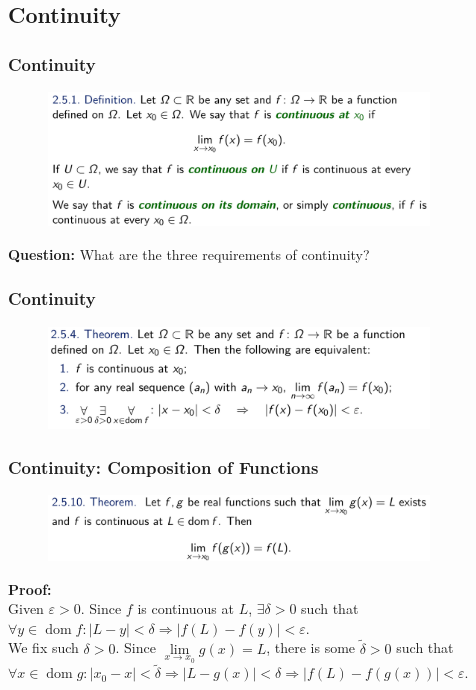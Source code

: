 \documentclass[10pt, t]{beamer}
\newcommand{\dom}{\operatorname{dom}}
\newcommand{\question}{\textbf{Question: }}
\begin{document}
\subsection{Continuity}
\begin{frame}
    \frametitle{Continuity}
    \begin{figure}[H]
        \centering
        \includegraphics[width=0.9\textwidth]{2020-10-28-09-59-20.png}
    \end{figure}
    \question What are the three requirements of continuity?
\end{frame}

\begin{frame}
    \frametitle{Continuity}

    \begin{figure}[H]
        \centering
        \includegraphics[width=0.9\textwidth]{2020-10-28-10-02-38.png}
    \end{figure}

\end{frame}

\begin{frame}
    \frametitle{Continuity: Composition of Functions}

    \begin{figure}[H]
        \centering
        \includegraphics[width=0.9\textwidth]{2020-10-28-10-10-08.png}
    \end{figure}
    \pause
    \textbf{Proof: } \\
    Given $\varepsilon>0$. Since $f$ is continuous at $L$, $\exists \delta>0$ such that $\forall y\in \dom f: |L-y|<\delta\Rightarrow |f(L)-f(y)|<\varepsilon$.\\[10pt]
    We fix such $\delta>0$. Since $\underset{x\to x_0}{\lim}g(x)=L$, there is some $\tilde\delta>0$ such that $\forall x\in \dom g: |x_0-x|<\tilde\delta\Rightarrow |L-g(x)|<\delta\Rightarrow|f(L)-f(g(x))|<\varepsilon$.
\end{frame}
\end{document}
